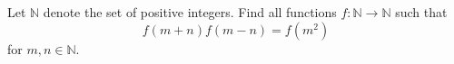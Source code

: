Let $\mathbb{N}$ denote the set of positive integers. Find all functions $f: \mathbb{N} \to \mathbb{N}$ such that \[ f(m+n)f(m-n) = f(m^2)  \] for $m,n \in \mathbb{N}$.
